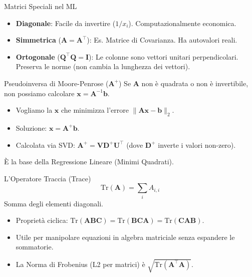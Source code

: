 \documentclass[aspectratio=169, 10pt]{beamer}
\begin{document}
\begin{frame}{Matrici Speciali nel ML}
    \begin{itemize}
        \item \textbf{Diagonale}: Facile da invertire ($1/x_i$). Computazionalmente economica.
        \item \textbf{Simmetrica} ($\mathbf{A} = \mathbf{A}^\top$): Es. Matrice di Covarianza. Ha autovalori reali.
        \item \textbf{Ortogonale} ($\mathbf{Q}^\top \mathbf{Q} = \mathbf{I}$): Le colonne sono vettori unitari perpendicolari. Preserva le norme (non cambia la lunghezza dei vettori).
    \end{itemize}
\end{frame}

\begin{frame}{Pseudoinversa di Moore-Penrose ($\mathbf{A}^+$)}
    Se $\mathbf{A}$ non è quadrata o non è invertibile, non possiamo calcolare $\mathbf{x} = \mathbf{A}^{-1}\mathbf{b}$.
    
    \begin{itemize}
        \item Vogliamo la $\mathbf{x}$ che minimizza l'errore $\|\mathbf{A}\mathbf{x} - \mathbf{b}\|_2$.
        \item Soluzione: $\mathbf{x} = \mathbf{A}^+ \mathbf{b}$.
        \item Calcolata via SVD: $\mathbf{A}^+ = \mathbf{V} \mathbf{D}^+ \mathbf{U}^\top$ (dove $\mathbf{D}^+$ inverte i valori non-zero).
    \end{itemize}
    \small È la base della Regressione Lineare (Minimi Quadrati).
\end{frame}

\begin{frame}{L'Operatore Traccia (Trace)}
    \[ \text{Tr}(\mathbf{A}) = \sum_{i} A_{i,i} \]
    Somma degli elementi diagonali.
    \begin{itemize}
        \item Proprietà ciclica: $\text{Tr}(\mathbf{ABC}) = \text{Tr}(\mathbf{BCA}) = \text{Tr}(\mathbf{CAB})$.
        \item Utile per manipolare equazioni in algebra matriciale senza espandere le sommatorie.
        \item La Norma di Frobenius (L2 per matrici) è $\sqrt{\text{Tr}(\mathbf{A}^\top \mathbf{A})}$.
    \end{itemize}
\end{frame}
\end{document}
